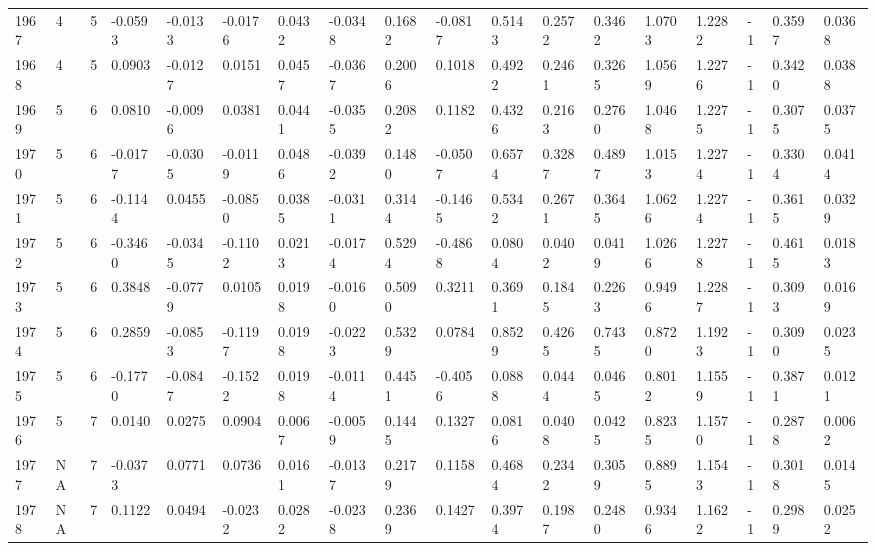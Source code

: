 \begin{tabular}{llllllllllllllllll}
1967 & 4 & 5 & -0.0593 & -0.0133 & -0.0176 & 0.0432 & -0.0348 & 0.1682 & -0.0817 & 0.5143 & 0.2572 & 0.3462 & 1.0703 & 1.2282 & -1 & 0.3597 & 0.0368 \\
1968 & 4 & 5 & 0.0903 & -0.0127 & 0.0151 & 0.0457 & -0.0367 & 0.2006 & 0.1018 & 0.4922 & 0.2461 & 0.3265 & 1.0569 & 1.2276 & -1 & 0.3420 & 0.0388 \\
1969 & 5 & 6 & 0.0810 & -0.0096 & 0.0381 & 0.0441 & -0.0355 & 0.2082 & 0.1182 & 0.4326 & 0.2163 & 0.2760 & 1.0468 & 1.2275 & -1 & 0.3075 & 0.0375 \\
1970 & 5 & 6 & -0.0177 & -0.0305 & -0.0119 & 0.0486 & -0.0392 & 0.1480 & -0.0507 & 0.6574 & 0.3287 & 0.4897 & 1.0153 & 1.2274 & -1 & 0.3304 & 0.0414 \\
1971 & 5 & 6 & -0.1144 & 0.0455 & -0.0850 & 0.0385 & -0.0311 & 0.3144 & -0.1465 & 0.5342 & 0.2671 & 0.3645 & 1.0626 & 1.2274 & -1 & 0.3615 & 0.0329 \\
1972 & 5 & 6 & -0.3460 & -0.0345 & -0.1102 & 0.0213 & -0.0174 & 0.5294 & -0.4868 & 0.0804 & 0.0402 & 0.0419 & 1.0266 & 1.2278 & -1 & 0.4615 & 0.0183 \\
1973 & 5 & 6 & 0.3848 & -0.0779 & 0.0105 & 0.0198 & -0.0160 & 0.5090 & 0.3211 & 0.3691 & 0.1845 & 0.2263 & 0.9496 & 1.2287 & -1 & 0.3093 & 0.0169 \\
1974 & 5 & 6 & 0.2859 & -0.0853 & -0.1197 & 0.0198 & -0.0223 & 0.5329 & 0.0784 & 0.8529 & 0.4265 & 0.7435 & 0.8720 & 1.1923 & -1 & 0.3090 & 0.0235 \\
1975 & 5 & 6 & -0.1770 & -0.0847 & -0.1522 & 0.0198 & -0.0114 & 0.4451 & -0.4056 & 0.0888 & 0.0444 & 0.0465 & 0.8012 & 1.1559 & -1 & 0.3871 & 0.0121 \\
1976 & 5 & 7 & 0.0140 & 0.0275 & 0.0904 & 0.0067 & -0.0059 & 0.1445 & 0.1327 & 0.0816 & 0.0408 & 0.0425 & 0.8235 & 1.1570 & -1 & 0.2878 & 0.0062 \\
1977 & NA & 7 & -0.0373 & 0.0771 & 0.0736 & 0.0161 & -0.0137 & 0.2179 & 0.1158 & 0.4684 & 0.2342 & 0.3059 & 0.8895 & 1.1543 & -1 & 0.3018 & 0.0145 \\
1978 & NA & 7 & 0.1122 & 0.0494 & -0.0232 & 0.0282 & -0.0238 & 0.2369 & 0.1427 & 0.3974 & 0.1987 & 0.2480 & 0.9346 & 1.1622 & -1 & 0.2989 & 0.0252 \\
\hline
\end{tabular}
